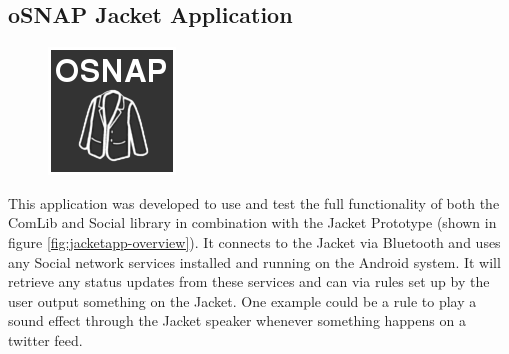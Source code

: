 \subsection{oSNAP Jacket Application} \label{section:app-jacket}
\begin{figure}
	\centering \includegraphics[scale=0.25]{img/app-jacket}
\end{figure}
This application was developed to use and test the full functionality of both the ComLib and Social library in combination with the
Jacket Prototype (shown in figure \ref{fig:jacketapp-overview}). It connects to the Jacket via Bluetooth and uses any Social network services installed and running on the
Android system. It will retrieve any status updates from these services and can via rules set up by the user output something
on the Jacket. One example could be a rule to play a sound effect through the Jacket speaker whenever something happens
on a twitter feed.

